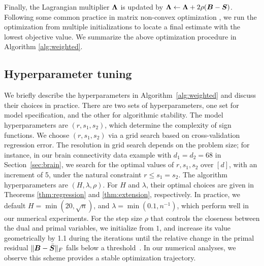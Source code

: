 \documentclass[11pt]{article}
\theoremstyle{plain}
\theoremstyle{definition}
\begin{document}
Finally, the Lagrangian multiplier $\bm{\Lambda}$ is updated by $\bm{\Lambda}\leftarrow\bm{\Lambda}+2\rho(\bm B-\bm S)$. Following some common practice in matrix non-convex optimization \citep{Ma2016}, we run the optimization from multiple initializations to locate a final estimate with the lowest objective value. We summarize the above optimization procedure in Algorithm \ref{alg:weighted}. 



\subsection{Hyperparameter tuning}

We briefly describe the hyperparameters in Algorithm~\ref{alg:weighted} and discuss their choices in practice. There are two sets of hyperparameters, one set for model specification, and the other for algorithmic stability. The model hyperparameters are $(r,s_1,s_2)$, which determine the complexity of sign functions. We choose $(r,s_1,s_2)$ via a grid search based on cross-validation regression error. The resolution in grid search depends on the problem size; for instance, in our brain connectivity data example with $d_1=d_2=68$ in Section~\ref{sec:brain}, we search for the optimal values of $r, s_1,s_2$ over $[d]$, with an increment of 5, under the natural constraint $r\leq s_1=s_2$. The algorithm hyperparameters are $(H, \lambda, \rho)$. For $H$ and $\lambda$, their optimal choices are given in Theorems \ref{thm:regression} and \ref{thm:extension}, respectively. In practice, we default $H=\min(20, \sqrt{n})$, and $\lambda=\min(0.1,n^{-1})$, which perform well in our numerical experiments. For the step size $\rho$ that controls the closeness between the dual and primal variables, we initialize from $1$, and increase its value geometrically by 1.1 during the iterations until the relative change in the primal residual $\lVert\bm B-\bar {\bm S}\rVert_F$ falls below a threshold~\citep{parikh2014proximal}. In our numerical analyses, we observe this scheme provides a stable optimization trajectory. 
\end{document}
